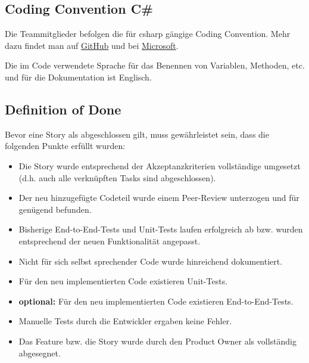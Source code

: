 \documentclass[../main.tex]{subfiles}
\begin{document}
    \subsection{Coding Convention C\#}
    \label{section:CodingConvention}
    \par Die Teammitglieder befolgen die für \gls{csharp} gängige Coding Convention. Mehr dazu findet man auf \href{https://github.com/ktaranov/naming-convention/blob/master/C\%23\%20Coding\%20Standards\%20and\%20Naming\%20Conventions.md}{GitHub} und bei \href{https://docs.microsoft.com/en-us/dotnet/csharp/programming-guide/inside-a-program/coding-conventions}{Microsoft}.
    \par Die im Code verwendete Sprache für das Benennen von Variablen, Methoden, etc. und für die Dokumentation ist Englisch.
    
	\subsection{Definition of Done}
	\label{section:DefinitionOfDone}
	\par Bevor eine Story als abgeschlossen gilt, muss gewährleistet sein, dass die folgenden Punkte erfüllt wurden:
	\begin{itemize}
		\item Die Story wurde entsprechend der Akzeptanzkriterien vollständige umgesetzt (d.h. auch alle verknüpften Tasks sind abgeschlossen). 
		\item Der neu hinzugefügte Codeteil wurde einem Peer-Review unterzogen und für genügend befunden.
		\item Bisherige End-to-End-Tests und Unit-Tests laufen erfolgreich ab bzw. wurden entsprechend der neuen Funktionalität angepasst.
		\item Nicht für sich selbst sprechender Code wurde hinreichend dokumentiert.
		\item Für den neu implementierten Code existieren Unit-Tests.
		\item \textbf{optional:} Für den neu implementierten Code existieren End-to-End-Tests.
		\item Manuelle Tests durch die Entwickler ergaben keine Fehler. 
		\item Das Feature bzw. die Story wurde durch den Product Owner als vollständig abgesegnet.
	\end{itemize}
\end{document}
